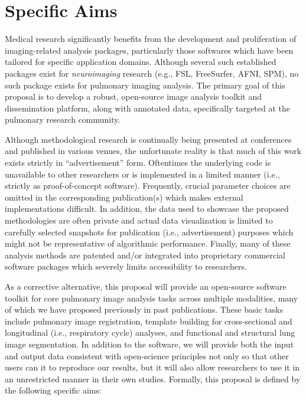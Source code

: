 \documentclass[11pt,]{article}
\title{}
\author{}
\date{}
\begin{document}
\maketitle


\section{Specific Aims}\label{specific-aims}

Medical research significantly benefits from the development and
proliferation of imaging-related analysis packages, particularly those
softwares which have been tailored for specific application domains.
Although several such established packages exist for \emph{neuroimaging}
research (e.g., FSL, FreeSurfer, AFNI, SPM), no such package exists for
pulmonary imaging analysis. The primary goal of this proposal is to
develop a robust, open-source image analysis toolkit and dissemination
platform, along with annotated data, specifically targeted at the
pulmonary research community.

Although methodological research is continually being presented at
conferences and published in various venues, the unfortunate reality is
that much of this work exists strictly in ``advertisement'' form.
Oftentimes the underlying code is unavailable to other researchers or is
implemented in a limited manner (i.e., strictly as proof-of-concept
software). Frequently, crucial parameter choices are omitted in the
corresponding publication(s) which makes external implementations
difficult. In addition, the data used to showcase the proposed
methodologies are often private and actual data visualization is limited
to carefully selected snapshots for publication (i.e., advertisement)
purposes which might not be representative of algorithmic performance.
Finally, many of these analysis methods are patented and/or integrated
into proprietary commercial software packages which severely limits
accessibility to researchers.

As a corrective alternative, this proposal will provide an open-source
software toolkit for core pulmonary image analysis tasks across multiple
modalities, many of which we have proposed previously in past
publications. These basic tasks include pulmonary image registration,
template building for cross-sectional and longitudinal (i.e.,
respiratory cycle) analyses, and functional and structural lung image
segmentation. In addition to the software, we will provide both the
input and output data consistent with open-science principles not only
so that other users can it to reproduce our results, but it will also
allow researchers to use it in an unrestricted manner in their own
studies. Formally, this proposal is defined by the following specific
aims:
\end{document}
